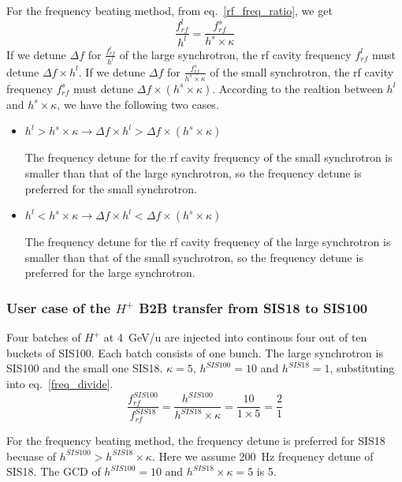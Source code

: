For the frequency beating method, from eq.~\ref{rf_freq_ratio}, we get
\begin{equation}
\frac{f_{rf}^{l}}{h^l}= \frac{f_{rf}^{s}}{h^s \times \kappa} 
\end{equation}
If we detune $\Delta f$ for $\frac{f_{rf}^{l}}{h^l}$ of the large synchrotron, the rf cavity frequency $ f_{rf}^{l}$ must detune $\Delta f \times h^l$. If we detune $\Delta f$ for $\frac{f_{rf}^{s}}{h^s \times \kappa}$ of the small synchrotron, the rf cavity frequency $ f_{rf}^{s}$ must detune $\Delta f \times (h^s \times \kappa)$. According to the realtion between $h^l$ and $h^s \times \kappa$, we have the following two cases.
\begin{itemize}
	\item $h^l > h^s \times \kappa \rightarrow \Delta f \times h^l > \Delta f \times (h^s \times \kappa)$ 

The frequency detune for the rf cavity frequency of the small synchrotron is smaller than that of the large synchrotron, so the frequency detune is preferred for the small synchrotron.
	\item $h^l < h^s \times \kappa \rightarrow \Delta f \times h^l < \Delta f \times (h^s \times \kappa)$

The frequency detune for the rf cavity frequency of the large synchrotron is smaller than that of the small synchrotron, so the frequency detune is preferred for the large synchrotron.
\end{itemize}

\subsubsection{User case of the $H^{+}$ B2B transfer from SIS18 to SIS100}
Four batches of $H^{+}$ at \SI{4}{GeV/\atomicmassunit} are injected into continous four out of ten buckets of SIS100. Each batch consists of one bunch. The large synchrotron is SIS100 and the small one SIS18. $\kappa=5$, $h^{SIS100}=10$ and $h^{SIS18}=1$, substituting into eq.~\ref{freq_divide}.
\begin{equation}
\frac{f_{rf}^{SIS100}}{f_{rf}^{SIS18}}= \frac {h^{SIS100}}{h^{SIS18} \times \kappa}= \frac{10}{1 \times 5}=\frac{2}{1}
\end{equation}

For the frequency beating method, the frequency detune is preferred for SIS18 becuase of $h^{SIS100} > h^{SIS18} \times \kappa$. Here we assume \SI{200}{Hz} frequency detune of SIS18. The GCD of $h^{SIS100}=10$ and $h^{SIS18} \times \kappa=5$  is 5.

